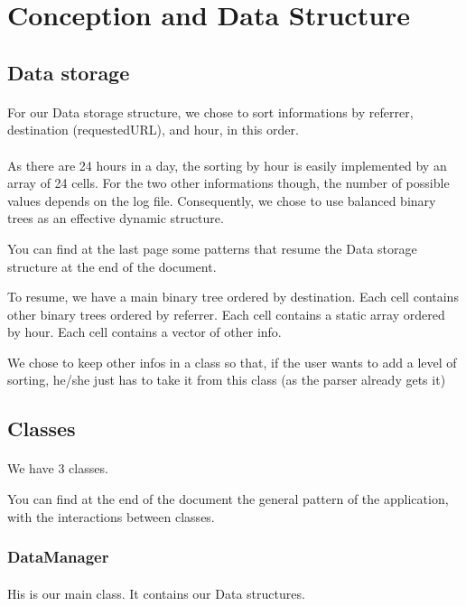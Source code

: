 \documentclass[a4paper, 12pts]{article}
\begin{document}
\newpage
 
\section{Conception and Data Structure}
\subsection{Data storage}
\paragraph{}
For our Data storage structure, we chose to sort informations by referrer, destination (requestedURL), and hour, in this order.
\paragraph{}
As there are 24 hours in a day, the sorting by hour is easily implemented by an array of 24 cells. For the two other informations though, the number of possible values depends on the log file. Consequently, we chose to use balanced binary trees as an effective dynamic structure.

You can find at the last page some patterns that resume the Data storage structure at the end of the document.

To resume, we have a main binary tree ordered by destination. Each cell contains other binary trees ordered by referrer. Each cell contains a static array ordered by hour. Each cell contains a vector of other info.

We chose to keep other infos in a class so that, if the user wants to add a level of sorting, he/she just has to take it from this class (as the parser already gets it)
\subsection{Classes}
\paragraph{}
We have 3 classes.

You can find at the end of the document the general pattern of the application, with the interactions between classes.

\subsubsection{DataManager}
\paragraph{}
His is our main class. It contains our Data structures.
\end{document}
